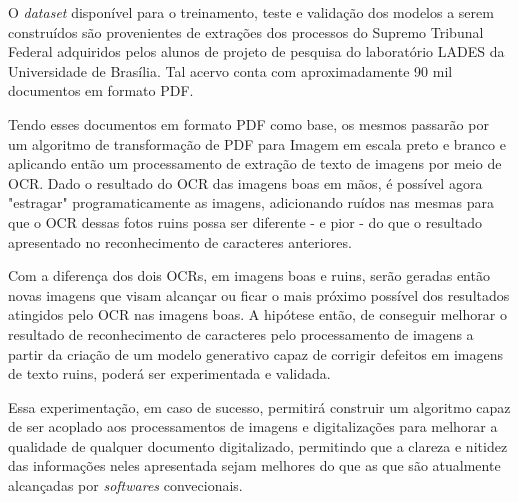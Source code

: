 O \textit{dataset} disponível para o treinamento, teste e validação dos modelos a serem construídos são provenientes de extrações dos processos do Supremo Tribunal Federal adquiridos pelos alunos de projeto de pesquisa do laboratório LADES da Universidade de Brasília. Tal acervo conta com aproximadamente 90 mil documentos em formato PDF.

Tendo esses documentos em formato PDF como base, os mesmos passarão por um algoritmo de transformação de PDF para Imagem em escala preto e branco e aplicando então um processamento de extração de texto de imagens por meio de OCR. Dado o resultado do OCR das imagens boas em mãos, é possível agora "estragar" programaticamente as imagens, adicionando ruídos nas mesmas para que o OCR dessas fotos ruins possa ser diferente - e pior - do que o resultado apresentado no reconhecimento de caracteres anteriores.

Com a diferença dos dois OCRs, em imagens boas e ruins, serão geradas então novas imagens que visam alcançar ou ficar o mais próximo possível dos resultados atingidos pelo OCR nas imagens boas. A hipótese então, de conseguir melhorar o resultado de reconhecimento de caracteres pelo processamento de imagens a partir da criação de um modelo generativo capaz de corrigir defeitos em imagens de texto ruins, poderá ser experimentada e validada.

Essa experimentação, em caso de sucesso, permitirá construir um algoritmo capaz de ser acoplado aos processamentos de imagens e digitalizações para melhorar a qualidade de qualquer documento digitalizado, permitindo que a clareza e nitidez das informações neles apresentada sejam melhores do que as que são atualmente alcançadas por \textit{softwares} convecionais.


